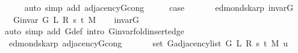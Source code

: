 \begin{isabellebody}
\ \ \ \ \isamarkupfalse%
\ {\isacharparenleft}{\kern0pt}auto\ simp\ add{\isacharcolon}{\kern0pt}\ adjacency{\isacharunderscore}{\kern0pt}G{}{\isacharunderscore}{\kern0pt}{}{\isacharunderscore}{\kern0pt}cong{\isacharparenright}{\kern0pt}\isanewline
\ \ \isamarkupfalse%
\ \isamarkupfalse%
\ {\isacharquery}{\kern0pt}case\isanewline
\ \ \ \ \isacommand{{\isachardot}{\kern0pt}}\isamarkupfalse%
\isanewline
{}\isamarkupfalse%
%
\endisatagproof
{\isafoldproof}%
%
\isadelimproof
\isanewline
%
\endisadelimproof
%
\isadeliminvisible
\isanewline
%
\endisadeliminvisible
%
\isataginvisible
{}\isamarkupfalse%
\ {\isacharparenleft}{\kern0pt}\ edmonds{\isacharunderscore}{\kern0pt}karp{\isacharparenright}{\kern0pt}\ invar{\isacharunderscore}{\kern0pt}G{}{\isacharunderscore}{\kern0pt}{}{\isacharcolon}{\kern0pt}\isanewline
\ \ \ {\isachardoublequoteopen}G{\isachardot}{\kern0pt}invar\ {\isacharparenleft}{\kern0pt}G{}{\isacharunderscore}{\kern0pt}{}\ L\ R\ s\ t\ M{\isacharparenright}{\kern0pt}{\isachardoublequoteclose}%
\endisataginvisible
{\isafoldinvisible}%
%
\isadeliminvisible
\isanewline
%
\endisadeliminvisible
%
\isadelimproof
\ \ %
\endisadelimproof
%
\isatagproof
{}\isamarkupfalse%
\ invar{\isacharunderscore}{\kern0pt}G{}{\isacharunderscore}{\kern0pt}{}\isanewline
\ \ \isamarkupfalse%
\ {\isacharparenleft}{\kern0pt}auto\ simp\ add{\isacharcolon}{\kern0pt}\ G{}{\isacharunderscore}{\kern0pt}{}{\isacharunderscore}{\kern0pt}def\ intro{\isacharcolon}{\kern0pt}\ G{\isachardot}{\kern0pt}invar{\isacharunderscore}{\kern0pt}fold{\isacharunderscore}{\kern0pt}insert{\isacharunderscore}{\kern0pt}edge{\isacharparenright}{\kern0pt}%
\endisatagproof
{\isafoldproof}%
%
\isadelimproof
\isanewline
%
\endisadelimproof
%
\isadeliminvisible
\isanewline
%
\endisadeliminvisible
%
\isataginvisible
{}\isamarkupfalse%
\ {\isacharparenleft}{\kern0pt}\ edmonds{\isacharunderscore}{\kern0pt}karp{\isacharparenright}{\kern0pt}\ adjacency{\isacharunderscore}{\kern0pt}G{}{\isacharunderscore}{\kern0pt}{}{\isacharunderscore}{\kern0pt}cong{\isacharcolon}{\kern0pt}\isanewline
\ \ \isanewline
\ \ \ \ {\isachardoublequoteopen}set\ {\isacharparenleft}{\kern0pt}G{\isachardot}{\kern0pt}adjacency{\isacharunderscore}{\kern0pt}list\ {\isacharparenleft}{\kern0pt}G{}{\isacharunderscore}{\kern0pt}{}\ L\ R\ s\ t\ M{\isacharparenright}{\kern0pt}\ u{\isacharparenright}{\kern0pt}\ {\isacharequal}{\kern0pt}\isanewline

\end{isabellebody}
